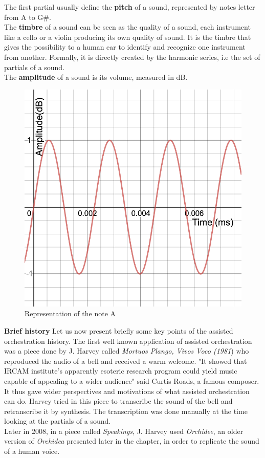 \documentclass[a4paper]{book}
\begin{document}
The first partial usually define the \textbf{pitch} of a sound, represented by notes letter from A to G$\#$.\\

The \textbf{timbre} of a sound can be seen as the quality of a sound, each instrument like a cello or a violin producing its own quality of sound. It is the timbre that gives the possibility to a human ear to identify and recognize one instrument from another. Formally, it is directly created by the harmonic series, i.e the set of partials of a sound.\\

The \textbf{amplitude} of a sound is its volume, measured in dB.\\

\begin{figure}[h!]
\centering
\includegraphics[scale=0.3]{A440.png}
\caption{Representation of the note A}
\label{figassistedorch}
\end{figure}

\textbf{Brief history}
Let us now present briefly some key points of the assisted orchestration history. The first well known application of assisted orchestration was a piece done by J. Harvey called \textit{Mortuos Plango, Vivos Voco (1981}) who reproduced the audio of a bell and received a warm welcome. "It showed that IRCAM institute's apparently esoteric research program could yield music capable of appealing to a wider audience" said Curtis Roads, a famous composer. It thus gave wider perspectives and motivations of what assisted orchestration can do. Harvey tried in this piece to transcribe the sound of the bell and retranscribe it by synthesis. The transcription was done manually at the time looking at the partials of a sound.\\
Later in 2008, in a piece called \textit{Speakings}, J. Harvey used \textit{Orchidee}, an older version of \textit{Orchidea} presented later in the chapter, in order to replicate the sound of a human voice.\\
\end{document}
